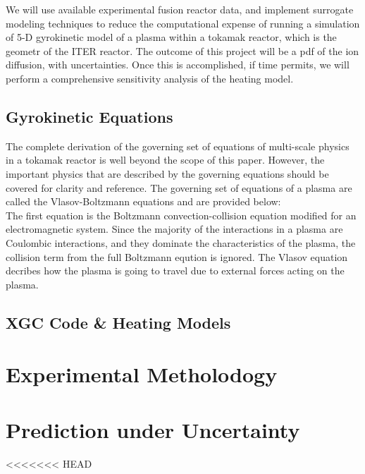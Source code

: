 \documentclass{article}
\begin{document}

We will use available experimental fusion reactor data, and implement surrogate modeling techniques to reduce the computational expense of running a simulation of 5-D  gyrokinetic model  of a plasma within a tokamak reactor, which is the geometr of the ITER reactor. The outcome of this project will be a pdf of the ion diffusion, with uncertainties. Once this is accomplished, if time permits, we will perform a %
comprehensive sensitivity analysis of the heating model.

\subsection{Gyrokinetic Equations}
The complete derivation of the governing set of equations of multi-scale physics in a tokamak reactor is well beyond the scope of this paper. However, the important physics that are described by the governing equations should be covered for clarity and reference. The governing set of equations of a plasma are called the Vlasov-Boltzmann equations and are provided below: 
$$
$$
The first equation is the Boltzmann convection-collision equation  modified for an electromagnetic system. Since the majority of the interactions in a plasma are Coulombic interactions, and they dominate the characteristics of the plasma, the collision term from the full Boltzmann eqution is ignored. The Vlasov equation decribes how the plasma is going to travel due to external forces acting on the plasma.
\subsection{XGC Code \& Heating Models}
\section{Experimental Metholodogy}

\section{Prediction under Uncertainty}


<<<<<<< HEAD
%
\end{document}
